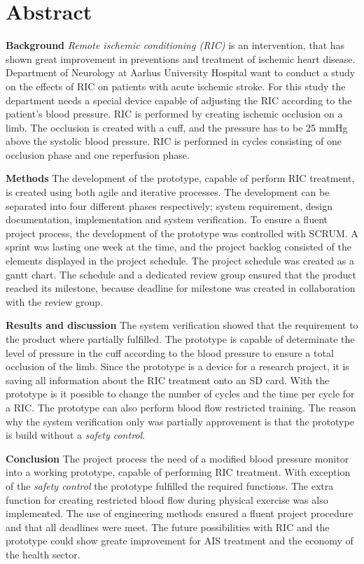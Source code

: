 \chapter*{Abstract}
\textbf{Background} \textit{Remote ischemic conditioning (RIC)} is an intervention, that has shown great improvement in preventions and treatment of ischemic heart disease. Department of Neurology at Aarhus University Hospital want to conduct a study on the effects of RIC on patients with acute ischemic stroke. For this study the department needs a special device capable of adjusting the RIC according to the patient's blood pressure. RIC is performed by creating ischemic occlusion on a limb. The occlusion is created with a cuff, and the pressure has to be 25 mmHg above the systolic blood pressure. RIC is performed in cycles consisting of one occlusion phase and one reperfusion phase. 

\textbf{Methods} The development of the prototype, capable of perform RIC treatment, is created using both agile and iterative processes. The development can be separated into four different phases respectively; system requirement, design documentation, implementation and system verification. To ensure a fluent project process, the development of the prototype was controlled with SCRUM. A sprint was lasting one week at the time, and the project backlog consisted of the elements displayed in the project schedule. The project schedule was created as a gantt chart. The schedule and a dedicated review group ensured that the product reached its milestone, because deadline for milestone was created in collaboration with the review group. 

\textbf{Results and discussion} The system verification showed that the requirement to the product where partially fulfilled. The prototype is capable of determinate the level of pressure in the cuff according to the blood pressure to ensure a total occlusion of the limb. Since the prototype is a device for a research project, it is saving all information about the RIC treatment onto an SD card. With the prototype is it possible to change the number of cycles and the time per cycle for a RIC. The prototype can also perform blood flow restricted training. The reason why the system verification only was partially approvement is that the prototype is build without a \textit{safety control}. 

\textbf{Conclusion}
The project process the need of a modified blood pressure monitor into a working prototype, capable of performing RIC treatment. With exception of the \textit{safety control} the prototype fulfilled the required functions. The extra function for creating restricted blood flow during physical exercise was also implemented. The use of engineering methods ensured a fluent project procedure and that all deadlines were meet. The future possibilities with RIC and the prototype could show greate improvement for AIS treatment and the economy of the health sector. 